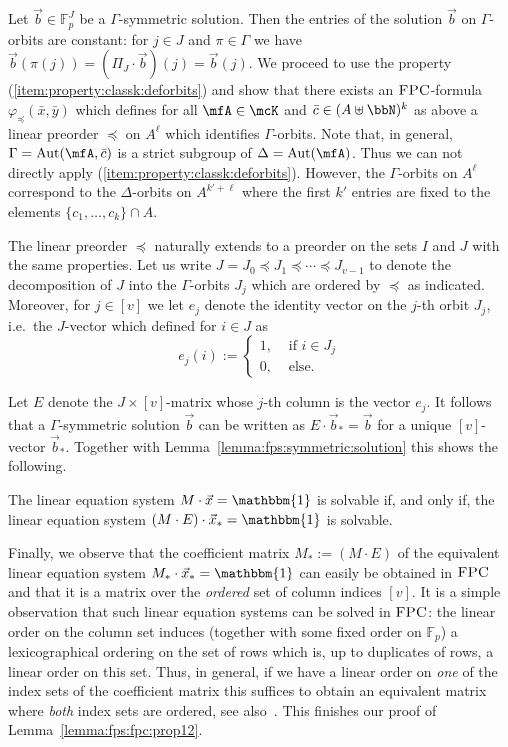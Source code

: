 \documentclass[a4paper,UKenglish]{lipics}
\newcommand{\defeq}{:=}
\newcommand{\inseg}[1]{\ensuremath{[#1]}}
\newcommand{\field}[1]{\mathbb{#1}}
\newcommand{\Aut}{\ensuremath{\text{Aut}}\xspace}
\newcommand{\onevec}{\ensuremath{\mathbbm{1}}}
\newcommand{\N}{\ensuremath{\bbN}}
\newcommand{\logic}[1]{\ensuremath{\textsc{#1}}\xspace}
\newcommand{\FPC}{\logic{FPC}}
\renewcommand{\phi}{\varphi}
\newcommand{\bc}{{\bar c}}
\newcommand{\bx}{{\bar x}}
\newcommand{\by}{{\bar y}}
\theoremstyle{plain}
\begin{document}
Let $\vec b \in \field F_p^J$ be a $\Gamma$-symmetric solution. Then the 
entries of the solution $\vec b$ on $\Gamma$-orbits are constant: for $j \in J$ 
and $\pi \in \Gamma$ we have $\vec b(\pi(j)) = (\Pi_J \cdot \vec b)(j) = \vec 
b(j)$.
We proceed to use the property (\ref{item:property:classk:deforbits}) and 
show that there exists an \FPC-formula $\phi_\preceq(\bx,\by)$  which 
defines for all $\mfA \in \mcK$ and $\bc \in (A\uplus \N)^k$ as above a 
linear preorder $\preceq$ on $A^\ell$ which identifies $\Gamma$-orbits. 
Note that, in general, $\Gamma=\Aut(\mfA,\bc)$ is a strict subgroup of 
$\Delta=\Aut(\mfA)$. Thus we can not directly apply 
(\ref{item:property:classk:deforbits}).
However, the $\Gamma$-orbits on 
$A^\ell$ correspond to the $\Delta$-orbits on 
$A^{k'+\ell}$ where the first $k'$ entries are fixed to the elements $\{ 
c_1, \dots, c_k \} \cap A$.

The linear preorder $\preceq$ naturally extends to a preorder on the 
sets $I$ and $J$ with the same properties.
Let us write $J = J_0 \preceq J_1 \preceq \cdots \preceq J_{v-1}$ to denote the 
decomposition of $J$ into the $\Gamma$-orbits $J_j$ which are ordered 
by $\preceq$ as indicated.
Moreover, for $j \in \inseg v$ we let $e_j$ denote the identity vector on the 
$j$-th orbit $J_j$, i.e.\ the $J$-vector which defined for $i \in J$ as
\[ e_j(i) \defeq 
\begin{cases}
1,&\text{ if } i \in J_j \\
0,&\text{ else.}
\end{cases} \]

Let $E$ denote the $J \times \inseg v$-matrix whose $j$-th column is the vector 
$e_j$. It follows that a $\Gamma$-symmetric solution $\vec b$ can be written as 
$E \cdot \vec b_* = \vec b$ for a unique $\inseg v$-vector $\vec b_*$.
Together with Lemma~\ref{lemma:fps:symmetric:solution} this shows the following.

\begin{lemma}
 The linear equation system $M \cdot \vec x = \onevec$ is solvable if, and only 
if, the linear equation system $(M \cdot E) \cdot \vec x_* = \onevec$ is 
solvable.
\end{lemma}

Finally, we observe that the coefficient matrix $M_* \defeq (M 
\cdot E)$ of the equivalent linear equation system $M_* \cdot \vec x_* = 
\onevec$ can easily be obtained in $\FPC$ and that it is a matrix over the 
\emph{ordered} set of column indices $\inseg v$. 
It is a simple observation that such linear equation systems can be solved 
in $\FPC$: the linear order on the column set induces 
(together with some fixed order on $\field F_p$) a lexicographical 
ordering on the set of rows which is, up to duplicates of rows, a 
linear order on this set. Thus, in general, if we have a linear order on 
\emph{one} of the index sets of the coefficient matrix this suffices to 
obtain an equivalent matrix where \emph{both} index sets are ordered, see 
also~\cite{Pa10}.
This finishes our proof of Lemma~\ref{lemma:fps:fpc:prop12}.
\end{document}
